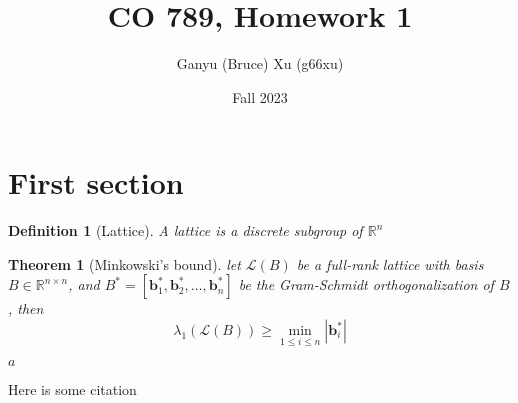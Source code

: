 \documentclass{article}
\title{CO 789, Homework 1}
\author{Ganyu (Bruce) Xu (g66xu)}
\date{Fall 2023}
\newcommand{\norm}[1]{\left\lvert {#1} \right\rvert}
\newtheorem{definition}{Definition}[section]
\newtheorem{theorem}{Theorem}[section]
\begin{document}
\maketitle

\section{First section}
\begin{definition}[Lattice]\label{lattice-def}
A lattice is a discrete subgroup of $\mathbb{R}^n$
\end{definition}

\begin{theorem}[Minkowski's bound]
    let $\mathcal{L}(B)$ be a full-rank lattice with basis $B \in \mathbb{R}^{n \times n}$, and $B^\ast = [\mathbf{b}_1^\ast, \mathbf{b}_2^\ast, \ldots, \mathbf{b}_n^\ast]$ be the Gram-Schmidt orthogonalization of $B$, then
    \begin{equation}
        \lambda_1(\mathcal{L}(B)) \geq \min_{1 \leq i \leq n}\norm{\mathbf{b}_i^\ast}
    \end{equation}
\end{theorem}

\begin{algorithm}
    \SetAlgoLined
    \caption{Euclid's algorithm}
    \Return $a$\;
\end{algorithm}

Here is some citation\cite{fujisaki1999secure}



\end{document}
